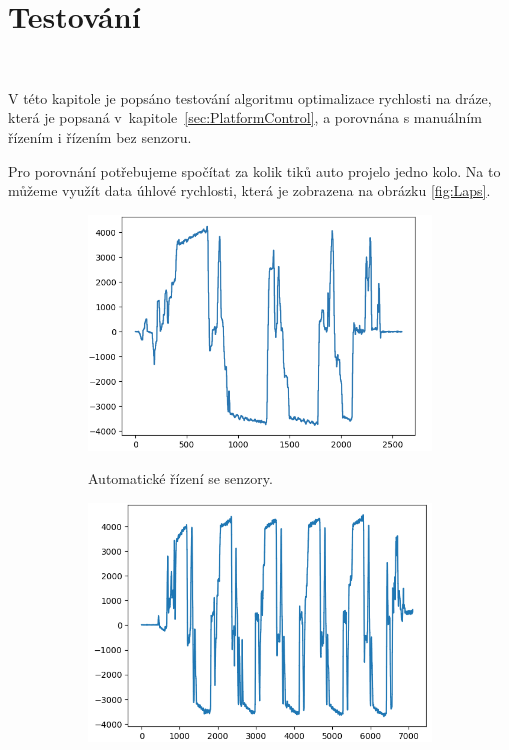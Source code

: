 \chapter{Testování}
\label{sec:Testing}\

V této kapitole je popsáno testování algoritmu optimalizace rychlosti na dráze,
která je popsaná v~kapitole~\ref{sec:PlatformControl}, a porovnána s manuálním
řízením i řízením bez senzoru.

Pro porovnání potřebujeme spočítat za kolik tiků auto projelo jedno kolo. 
Na to můžeme využít data úhlové rychlosti, která je zobrazena 
na obrázku \ref{fig:Laps}.

\begin{figure}[!h]
    \begin{subfigure}{.5\textwidth}
        \includegraphics[width = \textwidth]{Figures/LapAuto.png}
        \label{fig:LapsAuto}
        \caption{Automatické řízení se senzory.}
    \end{subfigure}
    \begin{subfigure}{.5\textwidth}
        \includegraphics[width = \textwidth]{Figures/LapAutoNoSensors.png}

\end{subfigure}
\end{figure}
